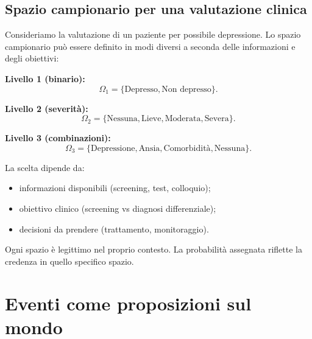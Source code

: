 \documentclass[
  letterpaper,
  DIV=11,
  numbers=noendperiod,
  oneside]{scrreprt}
\providecommand{\tightlist}{%
  \setlength{\itemsep}{0pt}\setlength{\parskip}{0pt}}
\theoremstyle{definition}
\theoremstyle{plain}
\theoremstyle{definition}
\theoremstyle{remark}
\begin{document}
\begin{tcolorbox}[enhanced jigsaw, arc=.35mm, breakable, colbacktitle=quarto-callout-note-color!10!white, opacityback=0, toprule=.15mm, rightrule=.15mm, colback=white, opacitybacktitle=0.6, leftrule=.75mm, coltitle=black, bottomtitle=1mm, left=2mm, toptitle=1mm, title=\textcolor{quarto-callout-note-color}{\faInfo}\hspace{0.5em}{Esempio psicologico}, titlerule=0mm, bottomrule=.15mm, colframe=quarto-callout-note-color-frame]

\subsection*{Spazio campionario per una valutazione
clinica}\label{spazio-campionario-per-una-valutazione-clinica}

Consideriamo la valutazione di un paziente per possibile depressione. Lo
spazio campionario può essere definito in modi diversi a seconda delle
informazioni e degli obiettivi:

\textbf{Livello 1 (binario):}
\[\Omega_1 = \{\text{Depresso}, \text{Non depresso}\}.\]

\textbf{Livello 2 (severità):}
\[\Omega_2 = \{\text{Nessuna}, \text{Lieve}, \text{Moderata}, \text{Severa}\}.\]

\textbf{Livello 3 (combinazioni):}
\[\Omega_3 = \{\text{Depressione}, \text{Ansia}, \text{Comorbidità}, \text{Nessuna}\}.\]

La scelta dipende da:

\begin{itemize}
\tightlist
\item
  informazioni disponibili (screening, test, colloquio);
\item
  obiettivo clinico (screening vs diagnosi differenziale);
\item
  decisioni da prendere (trattamento, monitoraggio).
\end{itemize}

Ogni spazio è legittimo nel proprio contesto. La probabilità assegnata
riflette la credenza in quello specifico spazio.

\end{tcolorbox}

\section{Eventi come proposizioni sul
mondo}\label{eventi-come-proposizioni-sul-mondo}
\end{document}
